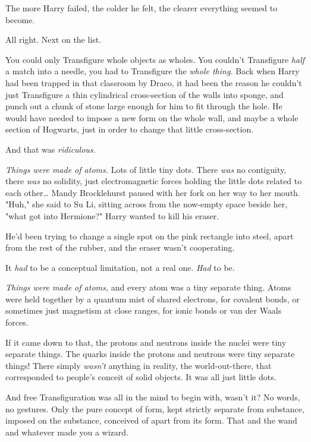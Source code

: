 The more Harry failed, the colder he felt, the clearer everything seemed to 
become.

All right. Next on the list.

You could only Transfigure whole objects as wholes. You couldn't Transfigure 
\emph{half} a match into a needle, you had to Transfigure the \emph{whole 
thing.} Back when Harry had been trapped in that classroom by Draco, it had 
been the reason he couldn't just Transfigure a thin cylindrical cross-section 
of the walls into sponge, and punch out a chunk of stone large enough for him 
to fit through the hole. He would have needed to impose a new form on the whole 
wall, and maybe a whole section of Hogwarts, just in order to change that 
little cross-section.

And that was \emph{ridiculous}.

\emph{Things were made of atoms.} Lots of little tiny dots. There \emph{was} no 
contiguity, there \emph{was} no solidity, just electromagnetic forces holding 
the little dots related to each other{\ldots}
\sbreak
Mandy Brocklehurst paused with her fork on her way to her mouth. "Huh," she 
said to Su Li, sitting across from the now-empty space beside her, "what got 
into Hermione?"
\sbreak
Harry wanted to kill his eraser.

He'd been trying to change a single spot on the pink rectangle into steel, 
apart from the rest of the rubber, and the eraser wasn't cooperating.

It \emph{had} to be a conceptual limitation, not a real one. \emph{Had} to be.

\emph{Things were made of atoms,} and every atom was a tiny separate thing. 
Atoms were held together by a quantum mist of shared electrons, for covalent 
bonds, or sometimes just magnetism at close ranges, for ionic bonds or van der 
Waals forces.

If it came down to that, the protons and neutrons inside the nuclei were tiny 
separate things. The quarks inside the protons and neutrons were tiny separate 
things! There simply \emph{wasn't} anything in reality, the world-out-there, 
that corresponded to people's conceit of solid objects. It was all just little 
dots.

And free Transfiguration was all in the mind to begin with, wasn't it? No 
words, no gestures. Only the pure concept of form, kept strictly separate from 
substance, imposed on the substance, conceived of apart from its form. That and 
the wand and whatever made you a wizard.

